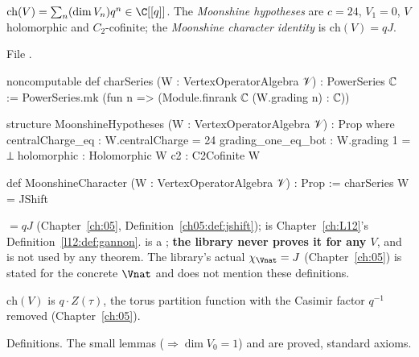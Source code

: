 \begin{definition}\label{l14:def:moonchar}
$\mathrm{ch}(V) = \sum_n(\dim V_n)q^n\in\C[[q]]$. The \emph{Moonshine hypotheses} are $c=24$, $V_1 = 0$, $V$ holomorphic and
$C_2$-cofinite; the \emph{Moonshine character identity} is $\mathrm{ch}(V) = qJ$.
\end{definition}
\noindent File .
\begin{leancode}
noncomputable def charSeries (W : VertexOperatorAlgebra 𝒱) : PowerSeries ℂ :=
  PowerSeries.mk (fun n => (Module.finrank ℂ (W.grading n) : ℂ))

structure MoonshineHypotheses (W : VertexOperatorAlgebra 𝒱) : Prop where
  centralCharge_eq : W.centralCharge = 24
  grading_one_eq_bot : W.grading 1 = ⊥
  holomorphic : Holomorphic W
  c2 : C2Cofinite W

def MoonshineCharacter (W : VertexOperatorAlgebra 𝒱) : Prop := charSeries W = JShift
\end{leancode}
\begin{dictionary}
 $=qJ$ (Chapter~\ref{ch:05}, Definition~\ref{ch05:def:jshift});  is Chapter~\ref{ch:L12}'s
Definition~\ref{l12:def:gannon}.  is a ; \textbf{the library never proves it for any $V$},
and  is not used by any theorem. The library's actual $\chi_{\Vnat} = J$ (Chapter~\ref{ch:05}) is stated
for the concrete $\Vnat$ and does not mention these definitions.
\end{dictionary}
\begin{physics}
$\mathrm{ch}(V)$ is $q\cdot Z(\tau)$, the torus partition function with the Casimir factor $q^{-1}$ removed (Chapter~\ref{ch:05}).
\end{physics}
\begin{status}
Definitions. The small lemmas  ($\Rightarrow\dim V_0 = 1$) and
 are proved, standard axioms.
\end{status}

